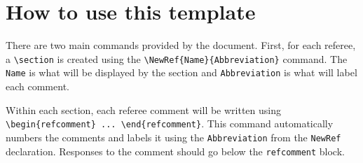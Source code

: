 \documentclass[12pt]{article}
\begin{document}
\newpage
\section*{How to use this template}

There are two main commands provided by the document. First, for each referee, a  \texttt{\textbackslash section} is created using the \texttt{\textbackslash NewRef\{Name\}\{Abbreviation\}} command. The \texttt{Name} is what will be displayed by the section and \texttt{Abbreviation} is what will label each comment.

Within each section, each referee comment will be written using \texttt{\textbackslash begin\{refcomment\} ... \textbackslash end\{refcomment\}}. This command automatically numbers the comments and labels it using the \texttt{Abbreviation} from the \texttt{NewRef} declaration. Responses to the comment should go below the \texttt{refcomment} block.
\end{document}
